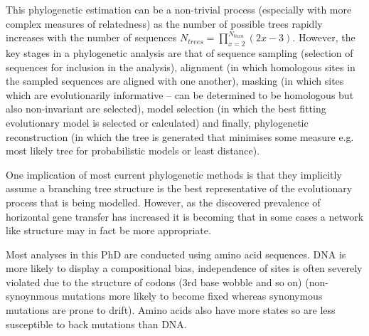 This phylogenetic estimation can be a non-trivial process (especially with more complex
measures of relatedness) as the number of
possible trees rapidly increases with the number of sequences \(N_{trees} = \prod_{x=2}^{N_{taxa}} (2x - 3)\).
However, the key stages in a phylogenetic analysis are that of sequence sampling (selection of
sequences for inclusion in the analysis),  alignment (in which homologous sites in the sampled sequences are aligned with one another),
 masking (in which sites which are evolutionarily informative – can be determined to be homologous 
     but also non-invariant are selected), model selection (in which the best fitting
 evolutionary model is selected or calculated) and finally, phylogenetic reconstruction (in which the tree
 is generated that minimises some measure e.g. most likely tree for probabilistic models or 
 least distance).


%
%
%
%
%
%
%
%
%
%
%




One implication of most current phylogenetic methods is that they implicitly
assume a branching tree structure is the best representative of the evolutionary
process that is being modelled.  However, as the discovered prevalence of
horizontal gene transfer has increased it is becoming that in some cases
a network like structure may in fact be more appropriate.


Most analyses in this PhD are conducted using amino acid sequences.  
DNA is more likely to display a compositional bias, independence of sites
is often severely violated due to the structure of codons (3rd base wobble and so on)
(non-synoynmous mutations more likely to become fixed whereas synonymous mutations are
prone to drift).  Amino acids also have more states so are less susceptible to back mutations
than DNA.  



